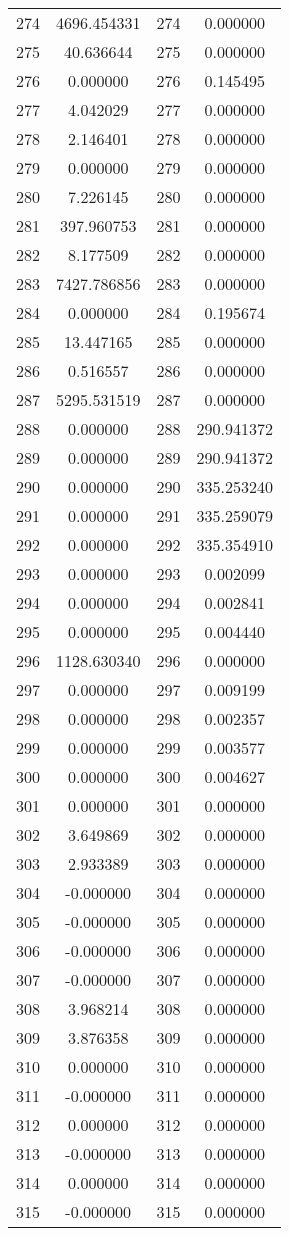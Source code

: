 \documentclass[12pt]{article}
\begin{document}
\begin{longtable}{@{}cccc@{}}
274 & 4696.454331 & 274 & 0.000000 \\
275 & 40.636644 & 275 & 0.000000 \\
276 & 0.000000 & 276 & 0.145495 \\
277 & 4.042029 & 277 & 0.000000 \\
278 & 2.146401 & 278 & 0.000000 \\
279 & 0.000000 & 279 & 0.000000 \\
280 & 7.226145 & 280 & 0.000000 \\
281 & 397.960753 & 281 & 0.000000 \\
282 & 8.177509 & 282 & 0.000000 \\
283 & 7427.786856 & 283 & 0.000000 \\
284 & 0.000000 & 284 & 0.195674 \\
285 & 13.447165 & 285 & 0.000000 \\
286 & 0.516557 & 286 & 0.000000 \\
287 & 5295.531519 & 287 & 0.000000 \\
288 & 0.000000 & 288 & 290.941372 \\
289 & 0.000000 & 289 & 290.941372 \\
290 & 0.000000 & 290 & 335.253240 \\
291 & 0.000000 & 291 & 335.259079 \\
292 & 0.000000 & 292 & 335.354910 \\
293 & 0.000000 & 293 & 0.002099 \\
294 & 0.000000 & 294 & 0.002841 \\
295 & 0.000000 & 295 & 0.004440 \\
296 & 1128.630340 & 296 & 0.000000 \\
297 & 0.000000 & 297 & 0.009199 \\
298 & 0.000000 & 298 & 0.002357 \\
299 & 0.000000 & 299 & 0.003577 \\
300 & 0.000000 & 300 & 0.004627 \\
301 & 0.000000 & 301 & 0.000000 \\
302 & 3.649869 & 302 & 0.000000 \\
303 & 2.933389 & 303 & 0.000000 \\
304 & -0.000000 & 304 & 0.000000 \\
305 & -0.000000 & 305 & 0.000000 \\
306 & -0.000000 & 306 & 0.000000 \\
307 & -0.000000 & 307 & 0.000000 \\
308 & 3.968214 & 308 & 0.000000 \\
309 & 3.876358 & 309 & 0.000000 \\
310 & 0.000000 & 310 & 0.000000 \\
311 & -0.000000 & 311 & 0.000000 \\
312 & 0.000000 & 312 & 0.000000 \\
313 & -0.000000 & 313 & 0.000000 \\
314 & 0.000000 & 314 & 0.000000 \\
315 & -0.000000 & 315 & 0.000000 \\

\end{longtable}
\end{document}
